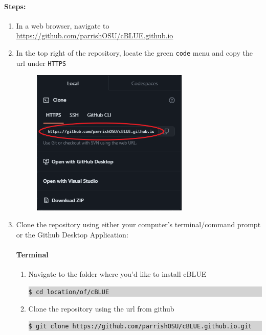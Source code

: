 \documentclass[11pt, a4paper]{article}
\begin{document}
\paragraph{Steps:}
\begin{enumerate}
    \item In a web browser, navigate to \url{https://github.com/parrishOSU/cBLUE.github.io}
    \vspace{1em}
    \item In the top right of the repository, locate the green \texttt{code} menu and copy the url under \texttt{HTTPS}
    
    \begin{figure}[H]
        \centering
        \includegraphics[height=7cm]{figs/cblue_download.png}
    \end{figure}
    \vspace{1em}
    \item Clone the repository using either your computer's terminal/command prompt or the Github Desktop Application:
    \paragraph{Terminal}
    \begin{enumerate}[label=(\alph*)]
        \item Navigate to the folder where you'd like to install cBLUE
        \colorbox{lightgray}{\begin{minipage}{\linewidth}
          \texttt{\$ cd location/of/cBLUE}
        \end{minipage}}
        \vspace{1em}
        \item Clone the repository using the url from github
        \colorbox{lightgray}{\begin{minipage}{\linewidth}
          \texttt{\$ git clone https://github.com/parrishOSU/cBLUE.github.io.git}
        \end{minipage}}
    \end{enumerate}

\end{enumerate}
\end{document}

